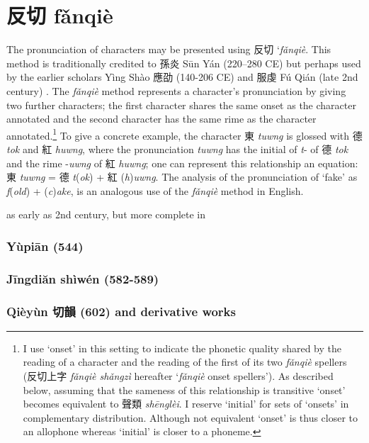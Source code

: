 \chapter{反切 fǎnqiè}
The pronunciation
of characters may be  presented using 反切 `\emph{fǎnqiè}. 
This method is traditionally credited to 孫炎 Sūn Yán
(220--280 CE) but perhaps used by the earlier scholars Yìng Shào 應劭
(140-206 CE) and 服虔 Fú Qián (late 2nd century) 
\citep[38]{Branner2000c}. The
 \emph{fǎnqiè} method represents a character's pronunciation by
giving two further characters; the first character shares the same onset
as the character annotated and the second character has the same rime as
the character annotated.\footnote{I use `onset' in this setting to
  indicate the phonetic quality shared by the reading of a character and
  the reading of the first of its two  \emph{fǎnqiè }spellers (反切上字
   \emph{fǎnqiè shǎngzì} hereafter `\emph{fǎnqiè} onset spellers'). As
  described below, assuming that the sameness of this relationship is
  transitive `onset' becomes equivalent to 聲類  \emph{shēnglèi}. I
  reserve `initial' for sets of `onsets' in complementary distribution.
  Although not equivalent `onset' is thus closer to an allophone whereas
  `initial' is closer to a phoneme.} To give a concrete example, the
character 東  \emph{tuwng} is glossed with 德 \emph{tok} and 紅
 \emph{huwng}, where the pro­nun­ci­a­tion \emph{tuwng} has the initial
of \emph{t}- of 德  \emph{tok} and the rime -\emph{uwng} of 紅
 \emph{huwng}; one can represent this relationship an equation: 東
 \emph{tuwng} = 德 \emph{t}(\emph{ok}) + 紅 (\emph{h})\emph{uwng}. The
analysis of the pro­nun­ci­a­tion of `fake' as \emph{f}(\emph{old}) +
(\emph{c})\emph{ake}, is an analogous use of the  \emph{fǎnqiè} method in
English.


as early as 2nd century, but more complete in

\subsection{Yùpiān (544)}

\subsection{Jīngdiăn shìwén (582-589)}

\subsection{Qièyùn 切韻  (602) and derivative works}

